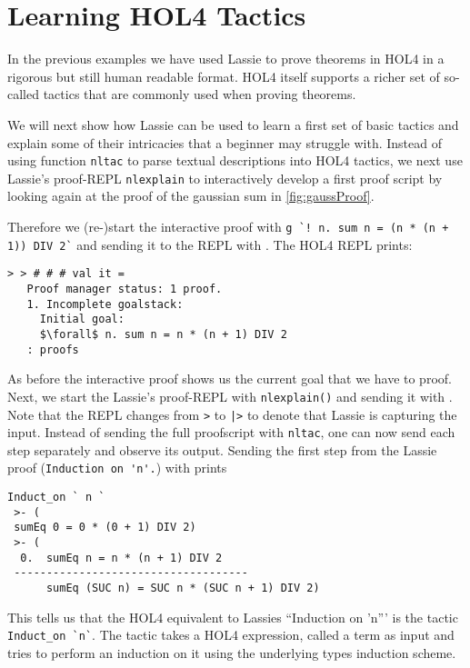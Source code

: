 \section{Learning HOL4 Tactics}

In the previous examples we have used Lassie to prove theorems in HOL4 in a
rigorous but still human readable format.
HOL4 itself supports a richer set of so-called tactics that are commonly used
when proving theorems.

We will next show how Lassie can be used to learn a first set of basic tactics
and explain some of their intricacies that a beginner may struggle with.
Instead of using function \lstinline{nltac} to parse textual descriptions into HOL4
tactics, we next use Lassie's proof-REPL \lstinline{nlexplain} to interactively
develop a first proof script by looking again at the proof of the gaussian sum
in \autoref{fig:gaussProof}.

Therefore we (re-)start the interactive proof with \lstinline{g `! n. sum n = (n * (n + 1)) DIV 2`}
and sending it to the REPL with .
The HOL4 REPL prints:
\begin{lstlisting}[frame=single, mathescape=true, deletekeywords={Proof}]
> > # # # val it =
   Proof manager status: 1 proof.
   1. Incomplete goalstack:
     Initial goal:
     $\forall$ n. sum n = n * (n + 1) DIV 2
   : proofs
\end{lstlisting}

As before the interactive proof shows us the current goal that we have to proof.
Next, we start the Lassie's proof-REPL with \lstinline{nlexplain()} and
sending it with .
Note that the REPL changes from \lstinline{>} to \lstinline{|>} to denote that
Lassie is capturing the input.
Instead of sending the full proofscript with \lstinline{nltac}, one can now send
each step separately and observe its output.
Sending the first step from the Lassie proof (\lstinline{Induction on 'n'.}) with
 prints
%
\begin{lstlisting}[frame=single]
Induct_on ` n `
 >- (
 sumEq 0 = 0 * (0 + 1) DIV 2)
 >- (
  0.  sumEq n = n * (n + 1) DIV 2
 ------------------------------------
      sumEq (SUC n) = SUC n * (SUC n + 1) DIV 2)
\end{lstlisting}

This tells us that the HOL4 equivalent to Lassies ``Induction on 'n''' is the
tactic \lstinline{Induct_on `n`}.
The tactic takes a HOL4 expression, called a term as input and tries to perform
an induction on it using the underlying types induction scheme.

